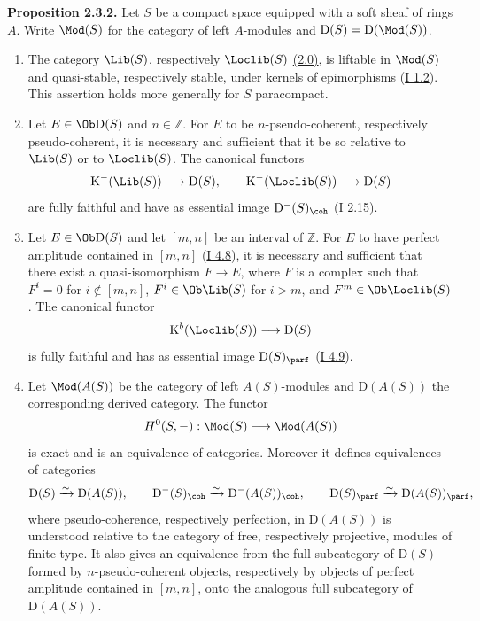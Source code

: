 \textbf{Proposition 2.3.2.} Let $S$ be a compact space equipped with a soft sheaf of rings $A$. Write $\Mod(S)$ for the category of left $A$-modules and $\mathrm D(S)=\mathrm D(\Mod(S))$.
\begin{enumerate}[label=\alph*)]
\item The category $\Lib(S)$, respectively $\Loclib(S)$ \hyperlink{sga6.e02.sec.2.0}{(2.0)}, is liftable in $\Mod(S)$ and quasi-stable, respectively stable, under kernels of epimorphisms (\hyperlink{sga6.e01.sec.1.2}{I 1.2}). This assertion holds more generally for $S$ paracompact.
\item Let $E\in\Ob\mathrm D(S)$ and $n\in\mathbb Z$. For $E$ to be $n$-pseudo-coherent, respectively pseudo-coherent, it is necessary and sufficient that it be so relative to $\Lib(S)$ or to $\Loclib(S)$. The canonical functors
\[
\mathrm K^{-}(\Lib(S))\longrightarrow \mathrm D(S),
\qquad
\mathrm K^{-}(\Loclib(S))\longrightarrow \mathrm D(S)
\]
are fully faithful and have as essential image $\mathrm D^{-}(S)_{\coh}$ (\hyperlink{sga6.e01.ex.2-15}{I 2.15}).
\item Let $E\in\Ob\mathrm D(S)$ and let $[m,n]$ be an interval of $\mathbb Z$. For $E$ to have perfect amplitude contained in $[m,n]$ (\hyperlink{sga6.e01.ex.4-8}{I 4.8}), it is necessary and sufficient that there exist a quasi-isomorphism $F\to E$, where $F$ is a complex such that $F^i=0$ for $i\notin[m,n]$, $F^i\in\Ob\Lib(S)$ for $i>m$, and $F^m\in\Ob\Loclib(S)$. The canonical functor
\[
\mathrm K^b(\Loclib(S))\longrightarrow \mathrm D(S)
\]
is fully faithful and has as essential image $\mathrm D(S)_{\parf}$ (\hyperlink{sga6.e01.notation.4-9}{I 4.9}).
\item Let $\Mod(A(S))$ be the category of left $A(S)$-modules and $\mathrm D(A(S))$ the corresponding derived category. The functor
\[
H^0(S,-):\Mod(S)\longrightarrow\Mod(A(S))
\]
is exact and is an equivalence of categories. Moreover it defines equivalences of categories
\[
\mathrm D(S)\xrightarrow{\sim}\mathrm D(A(S)),\qquad
\mathrm D^{-}(S)_{\coh}\xrightarrow{\sim}\mathrm D^{-}(A(S))_{\coh},\qquad
\mathrm D(S)_{\parf}\xrightarrow{\sim}\mathrm D(A(S))_{\parf},
\]
where pseudo-coherence, respectively perfection, in $\mathrm D(A(S))$ is understood relative to the category of free, respectively projective, modules of finite type. It also gives an equivalence from the full subcategory of $\mathrm D(S)$ formed by $n$-pseudo-coherent objects, respectively by objects of perfect amplitude contained in $[m,n]$, onto the analogous full subcategory of $\mathrm D(A(S))$.
\end{enumerate}

